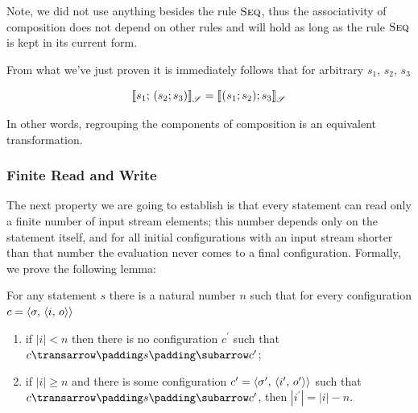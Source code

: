Note, we did not use anything besides the rule $\textsc{Seq}$, thus
the associativity of composition does not depend on other rules and will hold as long as the rule $\textsc{Seq}$
is kept in its current form.

From what we've just proven it is immediately follows that for arbitrary $s_1,\,s_2,\,s_3$ 

\[
\sembr{\llang{$s_1$; ($s_2$; $\,s_3$)}}^\ph_\mathscr{S}=\sembr{\llang{($s_1$; $\,s_2$); $\,s_3$}}^\ph_\mathscr{S}
\]

In other words, regrouping the components of composition is an equivalent transformation.

\subsubsection{Finite Read and Write}

The next property we are going to establish is that every statement can read only a finite number of input
stream elements; this number depends only on the statement itself, and for all initial configurations with an input stream
shorter than that number the evaluation never comes to a final configuration. Formally, we prove the following lemma:

\begin{lemma} For any statement $s$ there is a natural number $n$ such that for every configuration $c=\left<{\sigma,\,\left<{i,\,o}\right>}\right>$

\begin{enumerate}
\item if $|i|<n$ then there is no configuration $c^\prime$ such that $\trans{c}{s}{c^\prime}$;
\item if $|i|\ge n$ and there is some configuration $c^\prime=\left<{\sigma^\prime,\,\left<{i^\prime,\,o^\prime}\right>}\right>$ such that $\trans{c}{s}{c^\prime}$, then
  $|i^\prime|=|i|-n$.
\end{enumerate}

\end{lemma}

